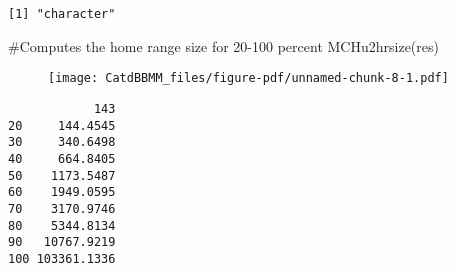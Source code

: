\documentclass[
  letterpaper,
]{book}
\newenvironment{Shaded}{\begin{snugshade}}{\end{snugshade}}
\newcommand{\CommentTok}[1]{\textcolor[rgb]{0.37,0.37,0.37}{#1}}
\newcommand{\DecValTok}[1]{\textcolor[rgb]{0.68,0.00,0.00}{#1}}
\newcommand{\FunctionTok}[1]{\textcolor[rgb]{0.28,0.35,0.67}{#1}}
\newcommand{\NormalTok}[1]{\textcolor[rgb]{0.00,0.23,0.31}{#1}}
\newcommand{\OtherTok}[1]{\textcolor[rgb]{0.00,0.23,0.31}{#1}}
\newcommand{\SpecialCharTok}[1]{\textcolor[rgb]{0.37,0.37,0.37}{#1}}
\newcommand{\StringTok}[1]{\textcolor[rgb]{0.13,0.47,0.30}{#1}}
\begin{document}
\begin{Shaded}
\end{Shaded}

\begin{verbatim}
[1] "character"
\end{verbatim}

\begin{Shaded}
\begin{Highlighting}[]
\CommentTok{\#Computes the home range size for 20{-}100 percent}
\FunctionTok{MCHu2hrsize}\NormalTok{(res)}
\end{Highlighting}
\end{Shaded}

\begin{figure}[H]

{\centering \texttt{[image: CatdBBMM\_files/figure-pdf/unnamed-chunk-8-1.pdf]}

}

\end{figure}

\begin{verbatim}
            143
20     144.4545
30     340.6498
40     664.8405
50    1173.5487
60    1949.0595
70    3170.9746
80    5344.8134
90   10767.9219
100 103361.1336
\end{verbatim}
\end{document}
